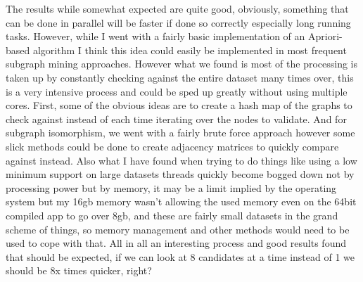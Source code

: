 \documentclass{article}
\begin{document}
The results while somewhat expected are quite good, obviously, something that can be done in parallel will be faster if done so correctly especially long running tasks. However, while I went with a fairly basic implementation of an Apriori-based algorithm I think this idea could easily be implemented in most frequent subgraph mining approaches. However what we found is most of the processing is taken up by constantly checking against the entire dataset many times over, this is a very intensive process and could be sped up greatly without using multiple cores. First, some of the obvious ideas are to create a hash map of the graphs to check against instead of each time iterating over the nodes to validate. And for subgraph isomorphism, we went with a fairly brute force approach however some slick methods could be done to create adjacency matrices to quickly compare against instead. Also what I have found when trying to do things like using a low minimum support on large datasets threads quickly become bogged down not by processing power but by memory, it may be a limit implied by the operating system but my 16gb memory wasn't allowing the used memory even on the 64bit compiled app to go over 8gb, and these are fairly small datasets in the grand scheme of things, so memory management and other methods would need to be used to cope with that. All in all an interesting process and good results found that should be expected, if we can look at 8 candidates at a time instead of 1 we should be 8x times quicker, right?
\end{document}
